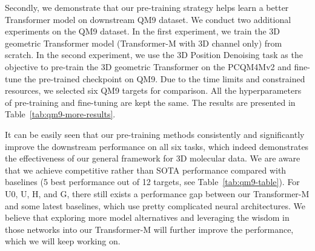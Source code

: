 \documentclass{article} \usepackage[dvipsnames]{xcolor}
\begin{document}
 Secondly, we demonstrate that our pre-training strategy helps learn a better Transformer model on downstream QM9 dataset. We conduct two additional experiments on the QM9 dataset. In the first experiment, we train the 3D geometric Transformer model (Transformer-M with 3D channel only) from scratch. In the second experiment, we use the 3D Position Denoising task as the objective to pre-train the 3D geometric Transformer on the PCQM4Mv2 and fine-tune the pre-trained checkpoint on QM9. Due to the time limits and constrained resources, we selected six QM9 targets for comparison. All the hyperparameters of pre-training and fine-tuning are kept the same. The results are presented in Table~\ref{tab:qm9-more-results}. 

\begin{table}[h]
\large
\centering
\caption{Investigation on the effectiveness of Transformer-M pre-training on QM9~\citep{ramakrishnan2014quantum}. The evaluation metric is the Mean Absolute Error (MAE).}
\label{tab:qm9-more-results}
\setlength\tabcolsep{5pt}
\renewcommand{\arraystretch}{1.0}
\end{table}

It can be easily seen that our pre-training methods consistently and significantly improve the downstream performance on all six tasks, which indeed demonstrates the effectiveness of our general framework for 3D molecular data. We are aware that we achieve competitive rather than SOTA performance compared with baselines (5 best performance out of 12 targets, see Table~\ref{tab:qm9-table}). For U0, U, H, and G, there still exists a performance gap between our Transformer-M and some latest baselines, which use pretty complicated neural architectures. We believe that exploring more model alternatives and leveraging the wisdom in those networks into our Transformer-M will further improve the performance, which we will keep working on.
\end{document}
